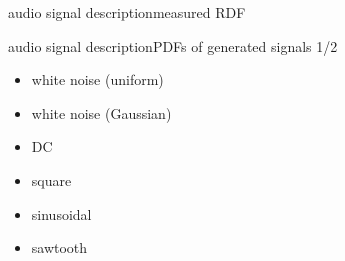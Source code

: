 \begin{frame}{audio signal description}{measured RDF}
	\begin{figure}
		\centering
	\end{figure}
\end{frame}	
	
\begin{frame}{audio signal description}{PDFs of generated signals 1/2}
	\begin{itemize}
		\item	white noise (uniform)
		\item	white noise (Gaussian)
		\item	DC
		\item	square
		\item	sinusoidal
		\item	sawtooth
	\end{itemize}
\end{frame}	
	
